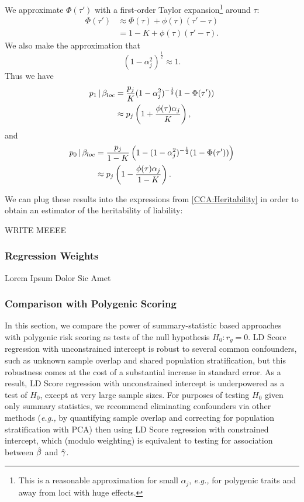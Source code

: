 \documentclass[11pt]{article}
\numberwithin{equation}{section}
\numberwithin{definition}{section}
\numberwithin{thm}{section}
\numberwithin{lemma}{section}
\numberwithin{prop}{section}
\numberwithin{cor}{section}
\numberwithin{hyp}{section}
\begin{document}
We approximate $\Phi(\tau')$ with a first-order Taylor expansion\footnote{
This is a reasonable approximation for small $\alpha_j$, \emph{e.g.,} for polygenic traits
and away from loci with huge effects.}
around $\tau$:
\begin{align*}
	\Phi(\tau') 
&\approx 
	\Phi(\tau) + \phi(\tau)(\tau'-\tau)\\
&=
	1-K + \phi(\tau)(\tau'-\tau).
\end{align*}
We also make the approximation that
$$(1-\alpha_j^2)^{\frac{1}{2}}\approx 1.$$
Thus we have
\begin{align}
\label{taylor1}
\notag
	p_1\,|\,\beta_{loc} 
&= 
	\dfrac{p_j}{K}(1-\alpha_j^2)^{-\frac{1}{2}}(1 - \Phi(\tau'))\\
&\approx
	p_j\left(1+\frac{\phi(\tau)\alpha_j}{K}\right),
\end{align}
and
\begin{align}
\label{taylor2}
\notag
	p_0\,|\,\beta_{loc} 
&=  
	\frac{p_j}{1-K}\left(
		1 - (1-\alpha_j^2)^{-\frac{1}{2}}(1 - \Phi(\tau'))
	\right)\\
&\approx
	p_j\left(1 - \frac{\phi(\tau)\alpha_j}{1-K}\right).
\end{align}

We can plug these results into the expressions from \ref{CCA:Heritability} in order to obtain an estimator of the heritability
of liability:
 
 WRITE MEEEE

\subsubsection{Regression Weights}\label{CCA:Regression Weights}

Lorem Ipsum Dolor Sic Amet

\subsubsection{Comparison with Polygenic Scoring}\label{Power}

In this section, we compare the power of summary-statistic based approaches with polygenic risk scoring as tests of the null
hypothesis $H_0: r_g=0$. LD Score regression with unconstrained intercept is robust to several
common confounders, such as unknown sample overlap and shared population stratification, but this robustness
comes at the cost of a substantial increase in standard error. 
As a result, LD Score regression with unconstrained intercept is 
underpowered as a test of $H_0$, except at very large sample sizes.
For purposes of testing $H_0$ given only summary statistics, we recommend eliminating confounders via other methods
(\emph{e.g.,} by quantifying sample overlap and correcting for population stratification with PCA) then using
LD Score regression with constrained intercept, which (modulo weighting) is equivalent to testing for association between
$\hat{\beta}$ and $\hat{\gamma}$.
\end{document}
